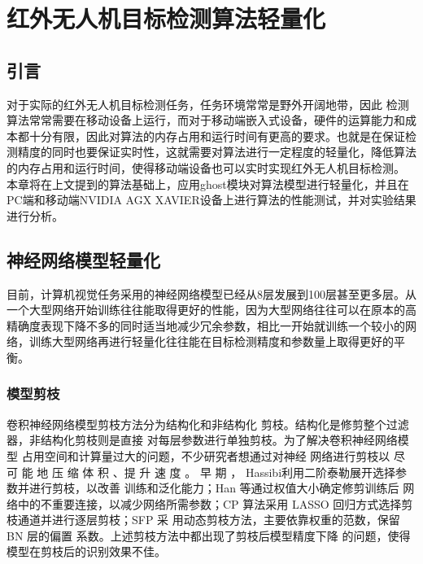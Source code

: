 
\chapter{红外无人机目标检测算法轻量化}

\section{引言}
对于实际的红外无人机目标检测任务，任务环境常常是野外开阔地带，因此
检测算法常常需要在移动设备上运行，而对于移动端嵌入式设备，硬件的运算能力和成本都十分有限，因此对算法的内存占用和运行时间有更高的要求。也就是在保证检测精度的同时也要保证实时性，这就需要对算法进行一定程度的轻量化，降低算法的内存占用和运行时间，使得移动端设备也可以实时实现红外无人机目标检测。
本章将在上文提到的算法基础上，应用ghost模块对算法模型进行轻量化，并且在PC端和移动端NVIDIA AGX XAVIER设备上进行算法的性能测试，并对实验结果进行分析。

\section{神经网络模型轻量化}
目前，计算机视觉任务采用的神经网络模型已经从8层发展到100层甚至更多层。从一个大型网络开始训练往往能取得更好的性能，因为大型网络往往可以在原本的高精确度表现下降不多的同时适当地减少冗余参数，相比一开始就训练一个较小的网络，训练大型网络再进行轻量化往往能在目标检测精度和参数量上取得更好的平衡。

\subsection{模型剪枝}
卷积神经网络模型剪枝方法分为结构化和非结构化
剪枝。结构化是修剪整个过滤器，非结构化剪枝则是直接
对每层参数进行单独剪枝。为了解决卷积神经网络模型
占用空间和计算量过大的问题，不少研究者想通过对神经
网络进行剪枝以 尽 可 能 地 压 缩 体 积 、提 升 速 度 。 早 期 ，
Hassibi\cite{hassibi1992second}利用二阶泰勒展开选择参数并进行剪枝，以改善
训练和泛化能力；Han 等\cite{han2015learning}通过权值大小确定修剪训练后
网络中的不重要连接，以减少网络所需参数；CP 算法采用
LASSO 回归方式选择剪枝通道并进行逐层剪枝\cite{he2017channel}；SFP 采
用动态剪枝方法，主要依靠权重的范数，保留 BN 层的偏置
系数\cite{anwar2017structured}。上述剪枝方法中都出现了剪枝后模型精度下降
的问题，使得模型在剪枝后的识别效果不佳。

